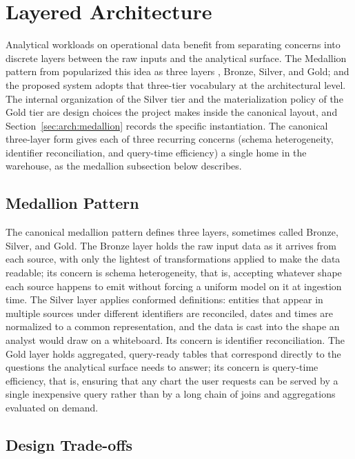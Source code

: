 \section{Layered Architecture}
\label{sec:foundations:layered}

Analytical workloads on operational data benefit from separating
concerns into discrete layers between the raw inputs and the
analytical surface. The Medallion pattern from
\cite{databricksMedallion} popularized this idea as three layers ,
Bronze, Silver, and Gold; and the proposed system adopts that
three-tier vocabulary at the architectural level. The internal
organization of the Silver tier and the materialization policy of
the Gold tier are design choices the project makes inside the
canonical layout, and Section~\ref{sec:arch:medallion}
records the specific instantiation. The canonical three-layer form
gives each of three recurring concerns (schema heterogeneity,
identifier reconciliation, and query-time efficiency) a single home
in the warehouse, as the medallion subsection below describes.

\subsection{Medallion Pattern}

The canonical medallion pattern defines three layers, sometimes called
Bronze, Silver, and Gold. The Bronze layer holds the raw input data as it
arrives from each source, with only the lightest of transformations
applied to make the data readable; its concern is schema heterogeneity,
that is, accepting whatever shape each source happens to emit without
forcing a uniform model on it at ingestion time. The Silver layer applies
conformed definitions: entities that appear in multiple sources under
different identifiers are reconciled, dates and times are normalized to a
common representation, and the data is cast into the shape an analyst
would draw on a whiteboard. Its concern is identifier reconciliation. The
Gold layer holds aggregated, query-ready tables that correspond directly
to the questions the analytical surface needs to answer; its concern is
query-time efficiency, that is, ensuring that any chart the user requests
can be served by a single inexpensive query rather than by a long chain
of joins and aggregations evaluated on demand.

\subsection{Design Trade-offs}


